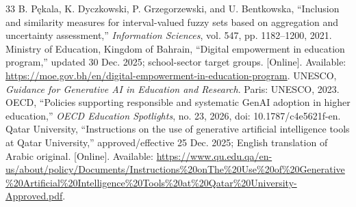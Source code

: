 \documentclass[conference,letterpaper]{IEEEtran}
\begin{document}
\begin{thebibliography}{33}
 B. P\k{e}kala, K. Dyczkowski, P. Grzegorzewski, and U. Bentkowska, ``Inclusion and similarity measures for interval-valued fuzzy sets based on aggregation and uncertainty assessment,'' \emph{Information Sciences}, vol. 547, pp. 1182--1200, 2021.
 Ministry of Education, Kingdom of Bahrain, ``Digital empowerment in education program,'' updated 30 Dec. 2025; school-sector target groups. [Online]. Available: \url{https://moe.gov.bh/en/digital-empowerment-in-education-program}.
 UNESCO, \emph{Guidance for Generative AI in Education and Research}. Paris: UNESCO, 2023.
 OECD, ``Policies supporting responsible and systematic GenAI adoption in higher education,'' \emph{OECD Education Spotlights}, no. 23, 2026, doi: 10.1787/c4e5621f-en.
 Qatar University, ``Instructions on the use of generative artificial intelligence tools at Qatar University,'' approved/effective 25 Dec. 2025; English translation of Arabic original. [Online]. Available: \url{https://www.qu.edu.qa/en-us/about/policy/Documents/Instructions%20onThe%20Use%20of%20Generative%20Artificial%20Intelligence%20Tools%20at%20Qatar%20University-Approved.pdf}.


\end{thebibliography}
\end{document}
